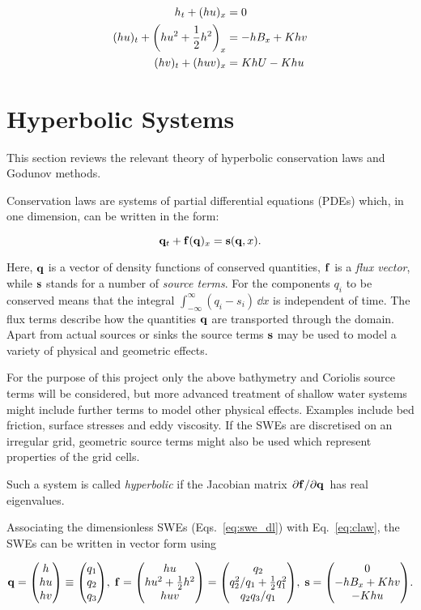 \begin{subequations}
  \label{eq:swe_dlU}
  \begin{align}
    h_{t} + (h u)_{x} & = 0 \\
    (hu)_{t} + \qty(hu^2 + \frac{1}{2} h^2)_{x} & = - hB_{x} + Khv \\
    (hv)_{t} + (huv)_{x} & = KhU-Khu
  \end{align}
\end{subequations}

\section{Hyperbolic Systems}

This section reviews the relevant theory of hyperbolic conservation laws and Godunov methods.

Conservation laws are systems of partial differential equations (PDEs) which, in one dimension, can be written in the form:

\begin{equation}
  \vb q_t + \vb f(\vb q)_x = \vb s(\vb q, x).
  \label{eq:claw}
\end{equation}

Here, $\vb q$ is a vector of density functions of conserved quantities, $\vb f$ is a \emph{flux vector}, while $\vb s$ stands for a number of \emph{source terms}. For the components $q_i$ to be conserved means that the integral $\int_{-\infty}^\infty (q_i - s_i)\,\dd x$ is independent of time. The flux terms describe how the quantities $\vb q$ are transported through the domain. Apart from actual sources or sinks the source terms $\vb s$ may be used to model a variety of physical and geometric effects.

For the purpose of this project only the above bathymetry and Coriolis source terms will be considered, but more advanced treatment of shallow water systems might include further terms to model other physical effects. Examples include bed friction, surface stresses and eddy viscosity. If the SWEs are discretised on an irregular grid, geometric source terms might also be used which represent properties of the grid cells.

Such a system is called \emph{hyperbolic} if the Jacobian matrix $\pdv*{\vb f}{\vb q}$ has real eigenvalues.

Associating the dimensionless SWEs (Eqs.~\ref{eq:swe_dl}) with Eq.~\ref{eq:claw}, the SWEs can be written in vector form using

$$
  \vb q = \mqty( h \\ hu \\ hv ) \equiv \mqty( q_1 \\ q_2 \\ q_3 ),\;
  \vb f = \mqty( hu \\ hu^2 + \frac{1}{2}h^2 \\ huv ) = \mqty( q_2 \\ q_2^2/q_1 + \frac{1}{2}q_1^2 \\ q_2q_3/q_1 ),\;
  \vb s = \mqty( 0 \\ - hB_x + Khv \\ - Khu ).
$$

